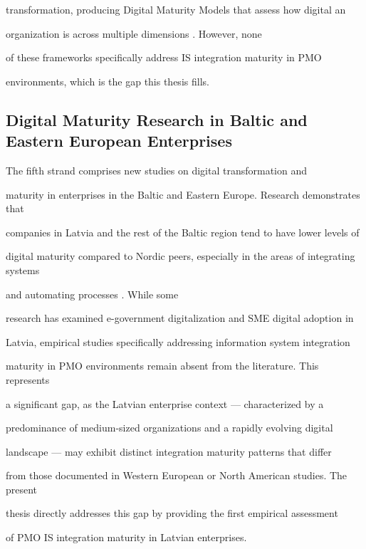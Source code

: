 transformation, producing Digital Maturity Models that assess how digital an  

organization is across multiple dimensions \cite{gartner2020}. However, none  

of these frameworks specifically address IS integration maturity in PMO  

environments, which is the gap this thesis fills. 

 

\subsection{Digital Maturity Research in Baltic and Eastern European Enterprises} 

The fifth strand comprises new studies on digital transformation and   

maturity in enterprises in the Baltic and Eastern Europe. Research demonstrates that   

companies in Latvia and the rest of the Baltic region tend to have lower levels of   

digital maturity compared to Nordic peers, especially in the areas of integrating systems 

and automating processes \cite{eurostat2023}. While some  

research has examined e-government digitalization and SME digital adoption in  

Latvia, empirical studies specifically addressing information system integration  

maturity in PMO environments remain absent from the literature. This represents  

a significant gap, as the Latvian enterprise context --- characterized by a  

predominance of medium-sized organizations and a rapidly evolving digital  

landscape --- may exhibit distinct integration maturity patterns that differ  

from those documented in Western European or North American studies. The present  

thesis directly addresses this gap by providing the first empirical assessment  

of PMO IS integration maturity in Latvian enterprises. 

